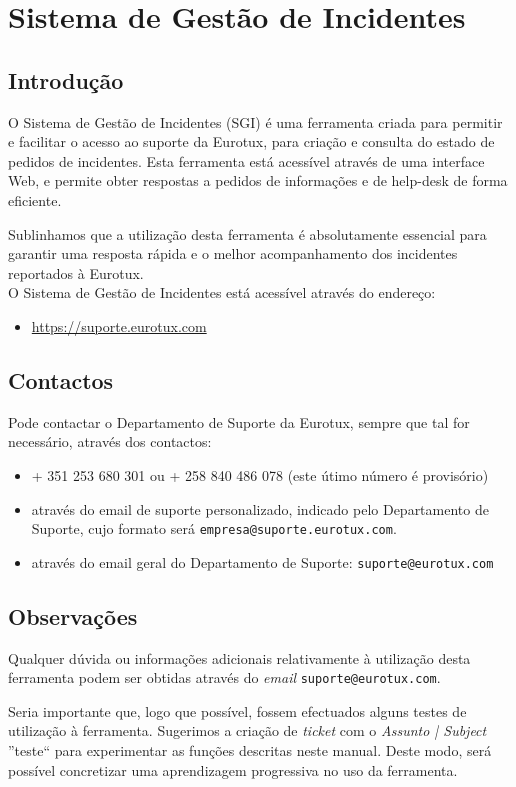 \chapter{Sistema de Gestão de Incidentes}
\section{Introdução}
O Sistema de Gestão de Incidentes (SGI) é uma ferramenta criada para permitir e facilitar o acesso ao suporte da Eurotux, para criação e consulta do estado de pedidos de incidentes. Esta ferramenta está acessível através de uma interface Web, e permite obter respostas a pedidos de informações e de help-desk de forma eficiente.

Sublinhamos que a utilização desta ferramenta é absolutamente essencial para garantir uma resposta rápida e o melhor acompanhamento dos incidentes reportados à Eurotux. \\

O Sistema de Gestão de Incidentes está acessível através do endereço:
\begin{itemize}
\item \url{https://suporte.eurotux.com}
\end{itemize}

\section{Contactos}\label{sgi:contactos}
Pode contactar o Departamento de Suporte da Eurotux, sempre que tal for necessário, através dos contactos:
\begin{itemize}
\item + 351 253 680 301 ou + 258 840 486 078 (este útimo número é provisório)
\item através do email de suporte personalizado, indicado pelo Departamento de Suporte, cujo formato será \texttt{empresa@suporte.eurotux.com}.
\item através do email geral do Departamento de Suporte: \texttt{suporte@eurotux.com}
\end{itemize}

\section{Observações}
Qualquer dúvida ou informações adicionais relativamente à utilização desta ferramenta podem ser obtidas através do \emph{email} \texttt{suporte@eurotux.com}.

Seria importante que, logo que possível, fossem efectuados alguns testes de utilização à ferramenta. Sugerimos a criação de \emph{ticket} com o \emph{Assunto | Subject} ''teste`` para experimentar as funções descritas neste manual. Deste modo, será possível concretizar uma aprendizagem progressiva no uso da ferramenta.

